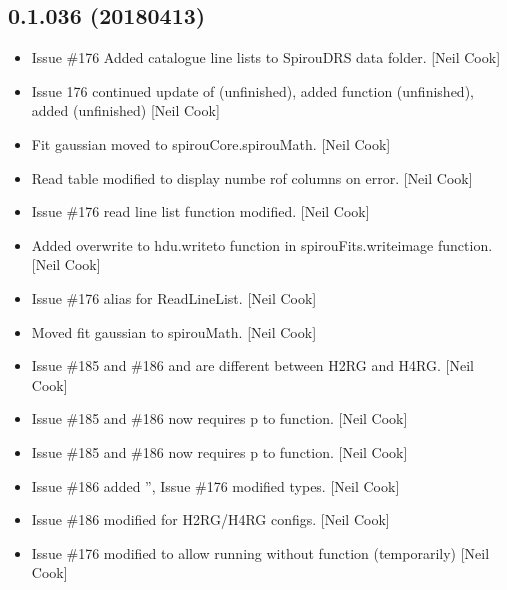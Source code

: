 \documentclass[a4paper,10pt,english]{report}
\begin{document}
\subsection{0.1.036 (2018\sphinxhyphen{}04\sphinxhyphen{}13)}
\label{\detokenize{misc/changelog:id481}}\begin{itemize}
\item {} 
Issue \#176 \sphinxhyphen{} Added catalogue line lists to SpirouDRS data folder.
{[}Neil Cook{]}

\item {} 
Issue 176 \sphinxhyphen{} continued update of  (unfinished),
added  function (unfinished), added 
(unfinished) {[}Neil Cook{]}

\item {} 
Fit gaussian moved to spirouCore.spirouMath. {[}Neil Cook{]}

\item {} 
Read table modified to display numbe rof columns on error. {[}Neil Cook{]}

\item {} 
Issue \#176 \sphinxhyphen{} read line list function modified. {[}Neil Cook{]}

\item {} 
Added overwrite to hdu.writeto function in spirouFits.writeimage
function. {[}Neil Cook{]}

\item {} 
Issue \#176 \sphinxhyphen{} alias for ReadLineList. {[}Neil Cook{]}

\item {} 
Moved fit gaussian to spirouMath. {[}Neil Cook{]}

\item {} 
Issue \#185 and \#186 \sphinxhyphen{}  and  are
different between H2RG and H4RG. {[}Neil Cook{]}

\item {} 
Issue \#185 and \#186 \sphinxhyphen{}  now requires p to function.
{[}Neil Cook{]}

\item {} 
Issue \#185 and \#186 \sphinxhyphen{}  now requires p to function.
{[}Neil Cook{]}

\item {} 
Issue \#186 \sphinxhyphen{} added ”, Issue \#176 \sphinxhyphen{} modified 
types. {[}Neil Cook{]}

\item {} 
Issue \#186 \sphinxhyphen{} modified  for H2RG/H4RG configs. {[}Neil Cook{]}

\item {} 
Issue \#176 \sphinxhyphen{} modified to allow running without function (temporarily)
{[}Neil Cook{]}

\end{itemize}
\end{document}

